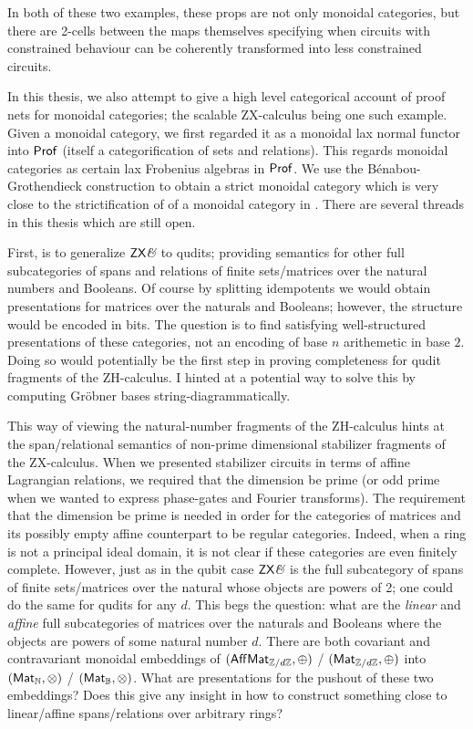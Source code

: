 In both of these two examples, these props are not only monoidal categories, but there are 2-cells between the maps themselves specifying when circuits with constrained behaviour can be coherently transformed into less constrained circuits.

In this thesis, we also attempt to give a high level categorical account of proof nets for monoidal categories; the scalable ZX-calculus being one such example.  Given a monoidal category, we first  regarded it as a monoidal lax normal functor into ${\sf Prof}$ (itself a categorification of sets and relations). This regards monoidal categories as certain lax Frobenius algebras in ${\sf Prof}$. We use the B\'enabou-Grothendieck construction to obtain a strict monoidal category which is very close to the strictification of of a monoidal category in \cite{wilson}.  
There are several threads in this thesis which are still open.

First, is to generalize $\mathsf{ZX}\textit{\&}$ to qudits; providing semantics for other full subcategories of spans and relations of finite sets/matrices over the natural numbers and Booleans.  Of course by splitting idempotents we would obtain presentations for matrices over the naturals and Booleans; however, the structure would be encoded in bits.  The question is to find satisfying well-structured presentations of these categories, not an encoding of base $n$ arithemetic in base $2$.  Doing so would potentially be the first step in proving completeness for qudit fragments of the ZH-calculus.  I hinted at a potential way to solve this by computing Gr\"obner bases string-diagrammatically.  

This way of viewing the natural-number fragments of the ZH-calculus hints at the span/relational semantics of non-prime dimensional stabilizer fragments of the  ZX-calculus.  When we presented stabilizer circuits in terms of affine Lagrangian relations, we required that the dimension be prime (or odd prime when we wanted to express phase-gates and Fourier transforms).  The requirement that the dimension be prime is needed in order for the categories of matrices and its possibly empty affine counterpart to be regular categories.  Indeed,  when a ring is not a principal ideal domain, it is not clear if these categories are even finitely complete.  However, just as in the qubit case $\mathsf{ZX}\textit{\&}$ is the full subcategory of spans of finite sets/matrices over the natural whose objects are powers of 2; one could do the same for qudits for any $d$.  This begs the question: what are the {\em linear} and {\em affine} full subcategories of matrices over the naturals and Booleans where the objects are powers of some natural number $d$.  There are both covariant and contravariant monoidal embeddings of $(\mathsf{Aff}\mathsf{Mat}_{\mathbb{Z}/d\mathbb{Z}},\oplus)$ / $(\mathsf{Mat}_{\mathbb{Z}/d\mathbb{Z}},\oplus)$ into $(\mathsf{Mat}_{\mathbb{N}},\otimes)$ / $(\mathsf{Mat}_{\mathbb{B}},\otimes)$.  What are presentations for the pushout of these two embeddings?  Does this give any insight in how to construct something close to linear/affine spans/relations over arbitrary rings?

